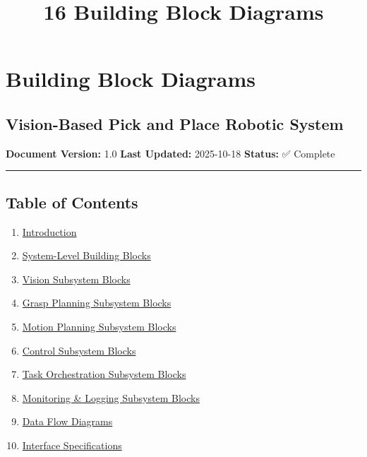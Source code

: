 \documentclass[
]{article}
\title{16 Building Block Diagrams}
\author{}
\date{}
\providecommand{\tightlist}{%
  \setlength{\itemsep}{0pt}\setlength{\parskip}{0pt}}
\begin{document}
\maketitle

{
\setcounter{tocdepth}{3}
\tableofcontents
}
\hypertarget{building-block-diagrams}{%
\section{Building Block Diagrams}\label{building-block-diagrams}}

\hypertarget{vision-based-pick-and-place-robotic-system}{%
\subsection{Vision-Based Pick and Place Robotic
System}\label{vision-based-pick-and-place-robotic-system}}

\textbf{Document Version:} 1.0 \textbf{Last Updated:} 2025-10-18
\textbf{Status:} ✅ Complete

\begin{center}\rule{0.5\linewidth}{0.5pt}\end{center}

\hypertarget{table-of-contents}{%
\subsection{Table of Contents}\label{table-of-contents}}

\begin{enumerate}
\def\labelenumi{\arabic{enumi}.}
\tightlist
\item
  \protect\hyperlink{1-introduction}{Introduction}
\item
  \protect\hyperlink{2-system-level-building-blocks}{System-Level
  Building Blocks}
\item
  \protect\hyperlink{3-vision-subsystem-blocks}{Vision Subsystem Blocks}
\item
  \protect\hyperlink{4-grasp-planning-subsystem-blocks}{Grasp Planning
  Subsystem Blocks}
\item
  \protect\hyperlink{5-motion-planning-subsystem-blocks}{Motion Planning
  Subsystem Blocks}
\item
  \protect\hyperlink{6-control-subsystem-blocks}{Control Subsystem
  Blocks}
\item
  \protect\hyperlink{7-task-orchestration-subsystem-blocks}{Task
  Orchestration Subsystem Blocks}
\item
  \protect\hyperlink{8-monitoring--logging-subsystem-blocks}{Monitoring
  \& Logging Subsystem Blocks}
\item
  \protect\hyperlink{9-data-flow-diagrams}{Data Flow Diagrams}
\item
  \protect\hyperlink{10-interface-specifications}{Interface
  Specifications}
\end{enumerate}
\end{document}
